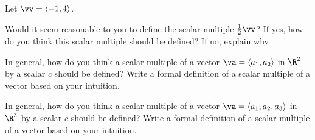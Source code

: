 \begin{activity} \label{A:9.2.4}
Let  $\vv = \langle -1, 4 \rangle$.
    \ba
    \item Would it seem reasonable to you to define the scalar multiple $\frac{1}{2}\vv$? If yes, how do you think this scalar multiple should be defined? If no, explain why.


    \item In general, how do you think a scalar multiple of a vector $\va = \langle a_1, a_2 \rangle$ in $\R^2$ by a scalar $c$ should be defined? Write a formal definition of a scalar multiple of a vector based on your intuition.


    \item In general, how do you think a scalar multiple of a vector $\va = \langle a_1, a_2, a_3 \rangle$ in $\R^3$ by a scalar $c$ should be defined? Write a formal definition of a scalar multiple of a vector based on your intuition.


    \ea

\end{activity}
\begin{smallhint}

\end{smallhint}
\begin{bighint}

\end{bighint}
\begin{activitySolution}

\end{activitySolution}
\aftera
